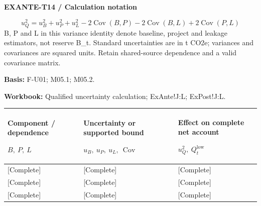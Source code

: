 \par\begingroup\sffamily\fontsize{8}{10}\selectfont\color{NEBGreen}\setlength{\parskip}{2pt}\setlength{\abovedisplayskip}{4pt}\setlength{\belowdisplayskip}{4pt}\setlength{\abovedisplayshortskip}{2pt}\setlength{\belowdisplayshortskip}{3pt}
\textbf{EXANTE-T14 / Calculation notation}\par
{\fontsize{9}{11}\selectfont\[ u_Q^2=u_B^2+u_P^2+u_L^2-2\operatorname{Cov}(B,P)-2\operatorname{Cov}(B,L)+2\operatorname{Cov}(P,L) \]}
B, P and L in this variance identity denote baseline, project and leakage estimators, not reserve B\_t. Standard uncertainties are in t CO2e; variances and covariances are squared units. Retain shared-source dependence and a valid covariance matrix.\par
\textbf{Basis:} F-U01; M05.1; M05.2.\par
\textbf{Workbook:} Qualified uncertainty calculation; ExAnte!J:L; ExPost!J:L.\par\endgroup
{\sffamily\fontsize{8.3}{10.3}\selectfont\begin{longtable}{@{}P{54.83mm} P{54.83mm} P{54.83mm}@{}}
\toprule
\textbf{Component / dependence}\par {\normalfont\fontsize{8.2}{10}\selectfont $B,\ P,\ L$} & \textbf{Uncertainty or supported bound}\par {\normalfont\fontsize{8.2}{10}\selectfont $u_B,\ u_P,\ u_L,\ \operatorname{Cov}$} & \textbf{Effect on complete net account}\par {\normalfont\fontsize{8.2}{10}\selectfont $u_Q^2,\ Q_t^{\mathrm{low}}$}\\\midrule\endhead
\rule{0pt}{8mm}[Complete] & [Complete] & [Complete]\\\hline
\rule{0pt}{8mm}[Complete] & [Complete] & [Complete]\\\hline
\rule{0pt}{8mm}[Complete] & [Complete] & [Complete]\\\hline
\end{longtable}}
